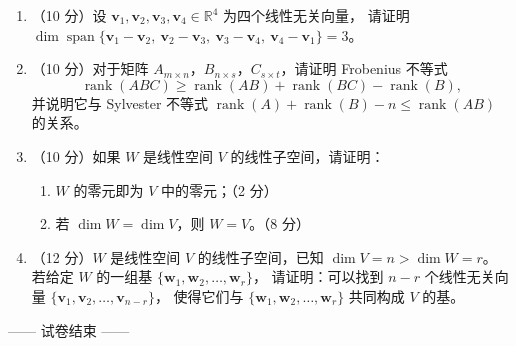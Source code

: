 \documentclass[11pt]{ctexart}
\newcommand{\Rr}{\mathbb{R}}
\newcommand{\rank}{\operatorname{rank}}
\begin{document}
\begin{enumerate}
\vspace{6cm}

\item （10 分）设 $\mathbf v_1,\mathbf v_2,\mathbf v_3,\mathbf v_4\in\Rr^4$ 为四个线性无关向量，
请证明 $\dim\operatorname{span}\{\mathbf v_1-\mathbf v_2,\ \mathbf v_2-\mathbf v_3,\ \mathbf v_3-\mathbf v_4,\ \mathbf v_4-\mathbf v_1\}=3$。

\newpage

\item （10 分）对于矩阵 $A_{m\times n}$，$B_{n\times s}$，$C_{s\times t}$，请证明 Frobenius 不等式
\[
\rank(ABC)\ge\rank(AB)+\rank(BC)-\rank(B),
\]
并说明它与 Sylvester 不等式 $\rank(A)+\rank(B)-n\le\rank(AB)$ 的关系。

\vspace{7cm}

\item （10 分）如果 $W$ 是线性空间 $V$ 的线性子空间，请证明：

\begin{enumerate}[label=(\arabic*),leftmargin=2.2em,itemsep=8pt]
\item $W$ 的零元即为 $V$ 中的零元；（2 分）
\item 若 $\dim W=\dim V$，则 $W=V$。（8 分）
\end{enumerate}

\newpage

\item （12 分）$W$ 是线性空间 $V$ 的线性子空间，已知 $\dim V=n>\dim W=r$。
若给定 $W$ 的一组基 $\{\mathbf w_1,\mathbf w_2,\dots,\mathbf w_r\}$，
请证明：可以找到 $n-r$ 个线性无关向量 $\{\mathbf v_1,\mathbf v_2,\dots,\mathbf v_{n-r}\}$，
使得它们与 $\{\mathbf w_1,\mathbf w_2,\dots,\mathbf w_r\}$ 共同构成 $V$ 的基。

\vspace{10cm}

\end{enumerate}

\vfill
\begin{center}
{\small —— 试卷结束 ——}
\end{center}
\end{document}
